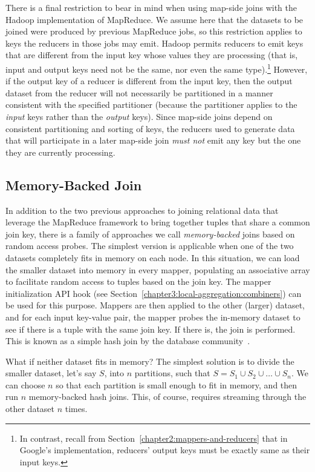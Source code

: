 There is a final restriction to bear in mind when using map-side joins
with the Hadoop implementation of MapReduce.  We assume here that the
datasets to be joined were produced by previous MapReduce jobs, so
this restriction applies to keys the reducers in those jobs may emit.
Hadoop permits reducers to emit keys that are different from the
input key whose values they are processing (that is, input and output
keys need not be the same, nor even the same type).\footnote{In
  contrast, recall from Section~\ref{chapter2:mappers-and-reducers}
  that in Google's implementation, reducers' output keys must be
  exactly same as their input keys.}  However, if the output key of a
reducer is different from the input key, then the output dataset from
the reducer will not necessarily be partitioned in a manner consistent
with the specified partitioner (because the partitioner applies to the
\emph{input} keys rather than the \emph{output} keys).  Since map-side
joins depend on consistent partitioning and sorting of keys, the
reducers used to generate data that will participate in a later
map-side join \emph{must not} emit any key but the one they are
currently processing.

\subsection{Memory-Backed Join}

In addition to the two previous approaches to joining relational data
that leverage the MapReduce framework to bring together tuples that
share a common join key, there is a family of approaches we call
\emph{memory-backed} joins based on random access probes.  The
simplest version is applicable when one of the two datasets completely
fits in memory on each node.  In this situation, we can load the
smaller dataset into memory in every mapper, populating an associative
array to facilitate random access to tuples based on the join key.
The mapper initialization API hook (see
Section~\ref{chapter3:local-aggregation:combiners}) can be used for
this purpose.  Mappers are then applied to the other (larger) dataset,
and for each input key-value pair, the mapper probes the in-memory
dataset to see if there is a tuple with the same join key.  If there
is, the join is performed.  This is known as a simple hash join by the
database community~\cite{DeWitt_etal_1984}.

What if neither dataset fits in memory?  The simplest solution is to
divide the smaller dataset, let's say $S$, into $n$ partitions, such
that $S= S_1 \cup S_2 \cup \ldots \cup S_n$.  We can choose $n$ so
that each partition is small enough to fit in memory, and then run $n$
memory-backed hash joins.  This, of course, requires streaming through
the other dataset $n$ times.


